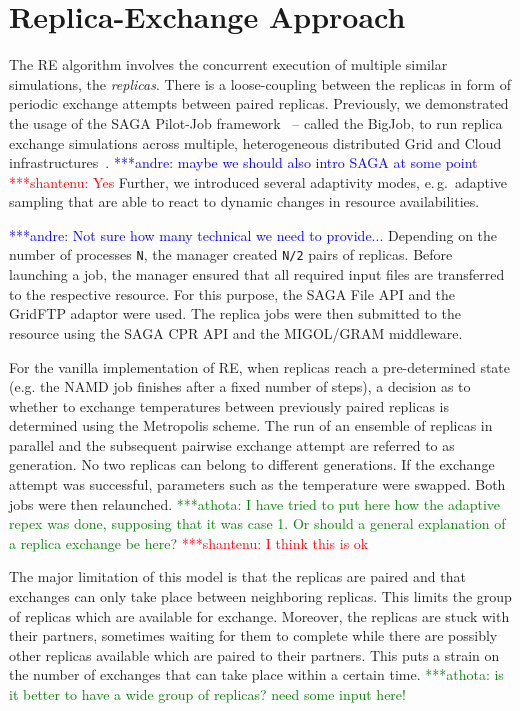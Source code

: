 \documentclass[a4paper,10pt]{article}
\newcommand{\jhanote}[1]{ {\textcolor{red} { ***shantenu: #1 }}}
\newcommand{\alnote}[1]{ {\textcolor{blue} { ***andre: #1 }}}
\newcommand{\athotanote}[1]{ {\textcolor{green} { ***athota: #1 }}}
\newcommand{\alnote}[1]{}
\newcommand{\jhanote}[1]{}
\newcommand{\athotanote}[1]{}
\begin{document}

\section{Replica-Exchange Approach}

The RE algorithm involves the concurrent execution of multiple similar
simulations, the \emph{replicas}.  There is a loose-coupling between
the replicas in form of periodic exchange attempts between paired
replicas. Previously, we demonstrated the usage of the SAGA Pilot-Job
framework~\cite{saga_bigjob_condor_cloud} -- called the BigJob, to run
replica exchange simulations across multiple, heterogeneous
distributed Grid and Cloud infrastructures~\cite{Luckow:2008fp}.
\alnote{maybe we should also intro SAGA at some point} \jhanote{Yes}
Further, we introduced several adaptivity modes, e.\,g.\ adaptive
sampling that are able to react to dynamic changes in resource
availabilities.

\alnote{Not sure how many technical we need to provide...}  Depending
on the number of processes \texttt{N}, the manager created \texttt{N/2} pairs
of replicas.  Before launching a job, the manager ensured that all
required input files are transferred to the respective resource. For
this purpose, the SAGA File API and the GridFTP adaptor were used. The
replica jobs were then submitted to the resource using the SAGA CPR
API and the MIGOL/GRAM middleware.

For the vanilla implementation of RE, when replicas reach a
pre-determined state (e.g. the NAMD job finishes after a fixed number
of steps), a decision as to whether to exchange temperatures between
previously paired replicas is determined using the Metropolis scheme.
The run of an ensemble of replicas in parallel and the subsequent
pairwise exchange attempt are referred to as generation. No two
replicas can belong to different generations. If the exchange attempt
was successful, parameters such as the temperature were swapped. Both
jobs were then relaunched.  \athotanote{I have tried to put here how
  the adaptive repex was done, supposing that it was case 1. Or should
  a general explanation of a replica exchange be here?} \jhanote{I
  think this is ok}
 
The major limitation of this model is that the replicas are paired and
that exchanges can only take place between neighboring replicas.  This
limits the group of replicas which are available for
exchange. Moreover, the replicas are stuck with their partners,
sometimes waiting for them to complete while there are possibly other
replicas available which are paired to their partners.  This puts a
strain on the number of exchanges that can take place within a certain
time.  \athotanote{is it better to have a wide group of replicas?
  need some input here!}
\end{document}
